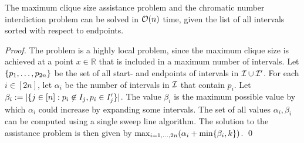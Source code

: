\begin{theorem}\label{thm:clique:assistance}
    The maximum clique size assistance problem and the chromatic number interdiction problem  can be solved in $\mathcal{O}(n)$ time, given the list of all intervals sorted with respect to endpoints. 
\end{theorem}
\begin{proof}
The problem is a highly local problem, since the maximum clique size is achieved at a point 
$x \in \mathbb{R}$ that is included in a maximum number of intervals.
Let $\{ p_1, \ldots, p_{2n} \}$ be the set of all start- and endpoints of intervals in $\mathcal{I} \cup \mathcal{I}'$. For each $i \in [2n]$, let $\alpha_i$ be the number of intervals in $\mathcal{I}$ that contain $p_i$. Let $\beta_i := |\{ j \in [n] : p_i \not\in I_j, p_i \in I'_j \}|$. The value $\beta_i$ is the maximum possible value by which $\alpha_i$ could increase by expanding some intervals. The set of all values $\alpha_i, \beta_i$ can be computed using a single sweep line algorithm. The solution to the assistance problem is then given by $\max_{i=1,\dots,2n} (\alpha_i + \min\{ \beta_i,k \})$.
\qed\end{proof}



%

